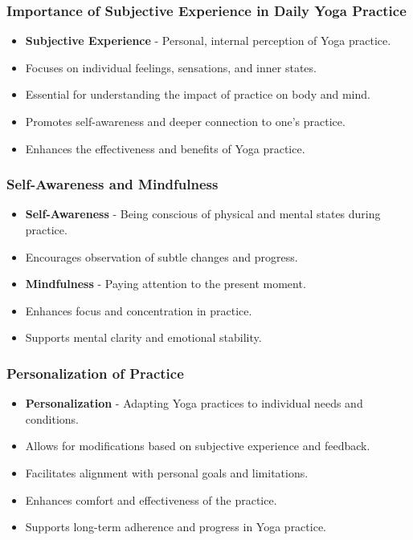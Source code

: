 \begin{frame}[fragile]\frametitle{Importance of Subjective Experience in Daily Yoga Practice}

      \begin{itemize}
		\item \textbf{Subjective Experience} - Personal, internal perception of Yoga practice.
		\item Focuses on individual feelings, sensations, and inner states.
		\item Essential for understanding the impact of practice on body and mind.
		\item Promotes self-awareness and deeper connection to one’s practice.
		\item Enhances the effectiveness and benefits of Yoga practice.
	  \end{itemize}

\end{frame}

\begin{frame}[fragile]\frametitle{Self-Awareness and Mindfulness}

      \begin{itemize}
		\item \textbf{Self-Awareness} - Being conscious of physical and mental states during practice.
		\item Encourages observation of subtle changes and progress.
		\item \textbf{Mindfulness} - Paying attention to the present moment.
		\item Enhances focus and concentration in practice.
		\item Supports mental clarity and emotional stability.
	  \end{itemize}

\end{frame}

\begin{frame}[fragile]\frametitle{Personalization of Practice}

      \begin{itemize}
		\item \textbf{Personalization} - Adapting Yoga practices to individual needs and conditions.
		\item Allows for modifications based on subjective experience and feedback.
		\item Facilitates alignment with personal goals and limitations.
		\item Enhances comfort and effectiveness of the practice.
		\item Supports long-term adherence and progress in Yoga practice.
	  \end{itemize}

\end{frame}

